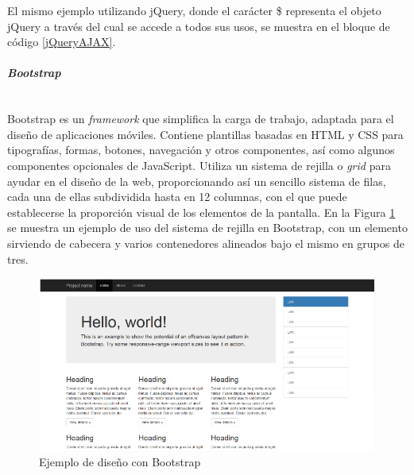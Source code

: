 El mismo ejemplo utilizando jQuery, donde el carácter \$ representa el objeto jQuery a través del cual se accede a todos sus usos, se muestra en el bloque de código \ref{jQueryAJAX}.


\paragraph{\emph{Bootstrap}}~\\

Bootstrap es un \emph{framework} que simplifica la carga de trabajo, adaptada para el diseño de aplicaciones móviles. Contiene plantillas basadas en HTML y CSS para tipografías, formas, botones, navegación y otros componentes, así como algunos componentes opcionales de JavaScript. Utiliza un sistema de rejilla o \emph{grid} para ayudar en el diseño de la web, proporcionando así un sencillo sistema de filas, cada una de ellas subdividida hasta en 12 columnas, con el que puede establecerse la proporción visual de los elementos de la pantalla. En la Figura \ref{gridBootstrap} se muestra un ejemplo de uso del sistema de rejilla en Bootstrap, con un elemento sirviendo de cabecera y varios contenedores alineados bajo el mismo en grupos de tres.

\begin{figure}[!t]
\begin{center}
\includegraphics[width=0.75\linewidth]{./3_Tecnologias/Img/gridBootstrap.png}
\end{center}
\caption{Ejemplo de diseño con Bootstrap}
\label{gridBootstrap}
\end{figure}